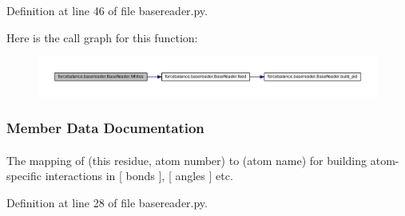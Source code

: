 \-Definition at line 46 of file basereader.\-py.



\-Here is the call graph for this function\-:
\nopagebreak
\begin{figure}[H]
\begin{center}
\leavevmode
\includegraphics[width=350pt]{classforcebalance_1_1basereader_1_1BaseReader_a2819ab1e523b6ff8e7467e56e3582386_cgraph}
\end{center}
\end{figure}




\subsubsection{\-Member \-Data \-Documentation}
\hypertarget{classforcebalance_1_1basereader_1_1BaseReader_a6c8914290178fd67fbe6a0753f9235f4}{
\paragraph[{adict}]{}}\label{classforcebalance_1_1basereader_1_1BaseReader_a6c8914290178fd67fbe6a0753f9235f4}


\-The mapping of (this residue, atom number) to (atom name) for building atom-\/specific interactions in \mbox{[} bonds \mbox{]}, \mbox{[} angles \mbox{]} etc. 



\-Definition at line 28 of file basereader.\-py.

\hypertarget{classforcebalance_1_1basereader_1_1BaseReader_a1c52efffef2504be2fe3fc0bacc71a62}{
\paragraph[{\-Atom\-Types}]{}}\label{classforcebalance_1_1basereader_1_1BaseReader_a1c52efffef2504be2fe3fc0bacc71a62}


